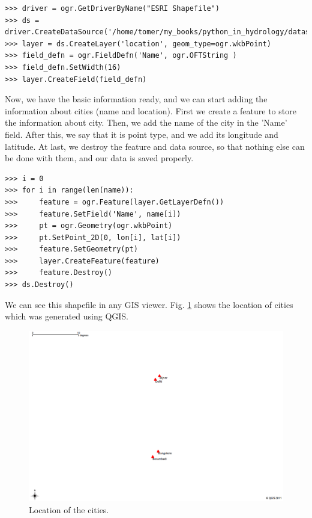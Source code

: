 \documentclass[10pt]{book}
\begin{document}
{\beforeverb \begin{verbatim}
>>> driver = ogr.GetDriverByName("ESRI Shapefile")
>>> ds = driver.CreateDataSource('/home/tomer/my_books/python_in_hydrology/datas/')
>>> layer = ds.CreateLayer('location', geom_type=ogr.wkbPoint)
>>> field_defn = ogr.FieldDefn('Name', ogr.OFTString )
>>> field_defn.SetWidth(16)
>>> layer.CreateField(field_defn)
\end{verbatim} \afterverb

Now, we have the basic information ready, and we can start adding the information about cities (name and location). First we create a feature to store the information about city. Then, we add the name of the city in the 'Name' field. After this, we say that it is point type, and we add its longitude and latitude. At last, we destroy the feature and data source, so that nothing else can be done with them, and our data is saved properly. 
\beforeverb \begin{verbatim}
>>> i = 0
>>> for i in range(len(name)):
>>>     feature = ogr.Feature(layer.GetLayerDefn())
>>>     feature.SetField('Name', name[i])
>>>     pt = ogr.Geometry(ogr.wkbPoint)
>>>     pt.SetPoint_2D(0, lon[i], lat[i])
>>>     feature.SetGeometry(pt)
>>>     layer.CreateFeature(feature)
>>>     feature.Destroy()
>>> ds.Destroy()
\end{verbatim} \afterverb

We can see this shapefile in any GIS viewer. Fig. \ref{fig:location} shows the location of cities which was generated using QGIS. 

\beforefig
\begin{figure}[h!]
  \centering
    \includegraphics[width=1.0\textwidth]{images/location.png}
  \caption{Location of the cities.}
   \label{fig:location}
\end{figure}
\afterfig

}
\end{document}
